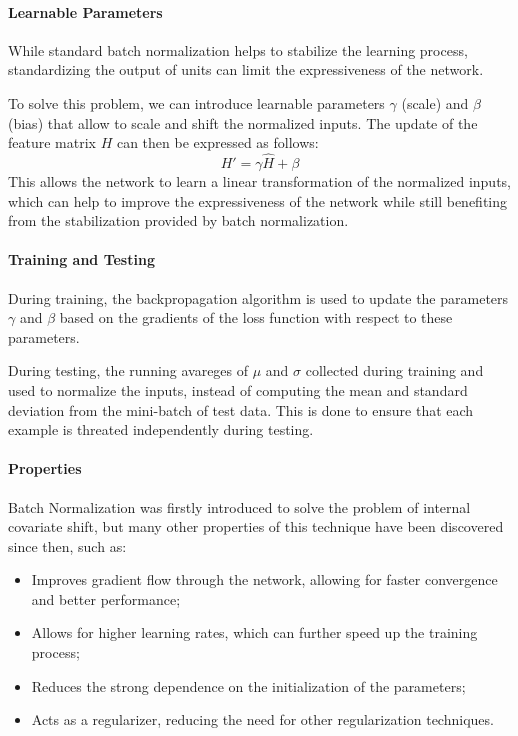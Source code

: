 \paragraph{Learnable Parameters}
While standard batch normalization helps to stabilize the learning process, standardizing the output of units can limit the expressiveness of the network.

To solve this problem, we can introduce learnable parameters $\gamma$ (scale) and $\beta$ (bias) that allow to scale and shift the normalized inputs. 
The update of the feature matrix $H$ can then be expressed as follows:
\begin{equation*}
    H' = \gamma \hat{H} + \beta
\end{equation*}
This allows the network to learn a linear transformation of the normalized inputs, which can help to improve the expressiveness 
of the network while still benefiting from the stabilization provided by batch normalization.

\paragraph{Training and Testing}
During training, the backpropagation algorithm is used to update the parameters $\gamma$ and $\beta$ based on the gradients of the loss function with respect to these parameters.

During testing, the running avareges of $\mu$ and $\sigma$ collected during training and used to normalize the inputs, instead of computing the mean and standard deviation from the mini-batch of test data.
This is done to ensure that each example is threated independently during testing.

\paragraph{Properties}
Batch Normalization was firstly introduced to solve the problem of internal covariate shift, 
but many other properties of this technique have been discovered since then, such as:
\begin{itemize}
    \item Improves gradient flow through the network, allowing for faster convergence and better performance;
    \item Allows for higher learning rates, which can further speed up the training process;
    \item Reduces the strong dependence on the initialization of the parameters;
    \item Acts as a regularizer, reducing the need for other regularization techniques.
\end{itemize}

